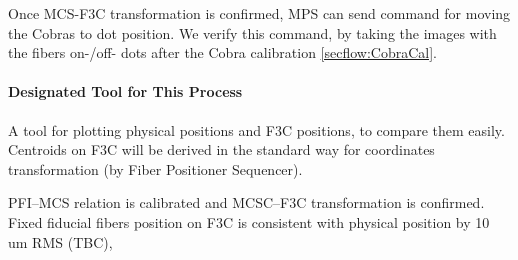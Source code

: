 Once MCS-F3C transformation is confirmed, MPS can send command for moving the Cobras to dot position.
We verify this command, by taking the images with the fibers on-/off- dots after the Cobra calibration \ref{secflow:CobraCal}.

\paragraph{Designated Tool for This Process}
A tool for plotting physical positions and F3C positions, to compare them easily.
Centroids on F3C will be derived in the standard way for coordinates transformation (by Fiber Positioner Sequencer).

\begin{itembox}[l]{}
PFI--MCS relation is calibrated and MCSC--F3C transformation is confirmed. \\
Fixed fiducial fibers position on F3C is consistent with physical position by 10 um RMS (TBC), 

\end{itembox}